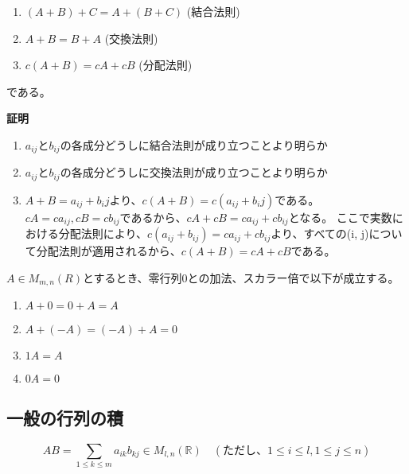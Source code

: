 \documentclass[dvipdfmx,autodetect-engine]{jsarticle}
\begin{document}

\begin{enumerate}
\renewcommand{\labelenumi}{(\arabic{enumi})}
\item $(A + B) + C = A + (B + C)$ \quad (結合法則)
\item $A + B = B + A$ \quad (交換法則)
\item $c(A+B) = cA + cB$ \quad (分配法則)
\end{enumerate}

である。

{\bf 証明}

\begin{enumerate}
\renewcommand{\labelenumi}{(\arabic{enumi})}
\item $a_{ij}とb_{ij}の各成分どうしに結合法則が成り立つことより明らか$
\item $a_{ij}とb_{ij}の各成分どうしに交換法則が成り立つことより明らか$
\item $A + B = a_{ij} + b_ij$より、$c(A + B) = c(a_{ij} + b_ij)$である。
$cA = ca_{ij}, cB = cb_{ij}$であるから、$cA + cB = ca_{ij} + cb_{ij}$となる。
ここで実数における分配法則により、$c(a_{ij} + b_{ij}) = ca_{ij} + cb_{ij}$より、すべての(i, j)について分配法則が適用されるから、$c(A+B) = cA + cB$である。
\end{enumerate}


$A \in M_{m,n}(R)$とするとき、零行列$0$との加法、スカラー倍で以下が成立する。

\begin{enumerate}
\renewcommand{\labelenumi}{(\arabic{enumi})}
\item $A + 0 = 0 + A = A$
\item $A + (-A) = (-A) + A = 0$
\item $1A = A$
\item $0A = 0$
\end{enumerate}


\subsection{一般の行列の積}

\label{defi:matrixMultiple}

$$
AB = \sum_{1 \leq k \leq m} a_{ik}b_{kj} \in M_{l, n}(\mathbb{R})
\quad (ただし、1 \leq i \leq l, 1 \leq j \leq n)
$$
\end{document}
